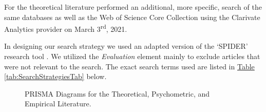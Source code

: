 \documentclass[man, 12pt, a4paper, mask]{apa7}
\newcommand{\tblref}[2][]{\hyperref[#2]{Table \ref*{#2}#1}}
\begin{document}
For the theoretical literature performed an additional, more specific, search of the same databases as well as the Web of Science Core Collection using the Clarivate Analytics provider on March 3\textsuperscript{rd}, 2021.

In designing our search strategy we used an adapted version of the `SPIDER' research tool \citep[e.g.,][]{Cooke2012}. We utilized the \textit{Evaluation} element mainly to exclude articles that were not relevant to the search. The exact search terms used are listed in \tblref{tab:SearchStrategiesTab} below.



\begin{figure}
\centering
\caption{PRISMA Diagrams for the Theoretical, Psychometric, and Empirical Literature.}
\label{fig:PrismaCombined}
\end{figure}
\end{document}
